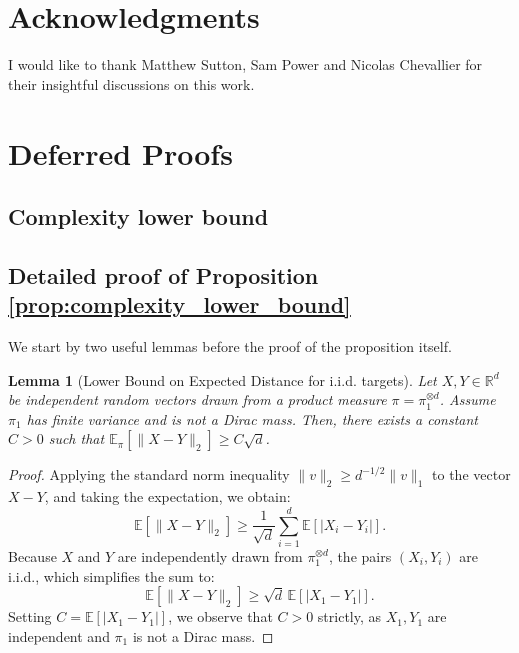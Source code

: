 \documentclass{article}
\newtheorem{lemma}{Lemma}
\begin{document}
\section*{Acknowledgments}

I would like to thank Matthew Sutton, Sam Power and Nicolas Chevallier for their insightful discussions on this work.




\appendix
\section{Deferred Proofs}
\label{app:proofs}

\subsection{Complexity lower bound}


\subsection{Detailed proof of Proposition \ref{prop:complexity_lower_bound}}
\label{app:proofs_proposition_complexity_bound}

We start by two useful lemmas before the proof of the proposition itself.

\begin{lemma}[Lower Bound on Expected Distance for i.i.d. targets]
    \label{lem:distance_lower}
    Let $X, Y \in \mathbb{R}^d$ be independent random vectors drawn from a product measure $\pi = \pi_1^{\otimes d}$. Assume $\pi_1$ has finite variance and is not a Dirac mass. Then, there exists a constant $C > 0$ such that $\mathbb{E}_\pi[\|X - Y\|_2] \ge C \sqrt{d}$.
\end{lemma}
\begin{proof}
    Applying the standard norm inequality $\|v\|_2 \ge d^{-1/2} \|v\|_1$ to the vector $X - Y$, and taking the expectation, we obtain:
    \[
        \mathbb{E}[\|X - Y\|_2] \ge \frac{1}{\sqrt{d}} \sum_{i=1}^d \mathbb{E}[|X_i - Y_i|].
    \]
    Because $X$ and $Y$ are independently drawn from $\pi_1^{\otimes d}$, the pairs $(X_i, Y_i)$ are i.i.d., which simplifies the sum to:
    \[
        \mathbb{E}[\|X - Y\|_2] \ge \sqrt{d} \, \mathbb{E}[|X_1 - Y_1|].
    \]
    Setting $C = \mathbb{E}[|X_1 - Y_1|]$, we observe that $C > 0$ strictly, as $X_1, Y_1$ are independent and $\pi_1$ is not a Dirac mass.
\end{proof}
\end{document}
